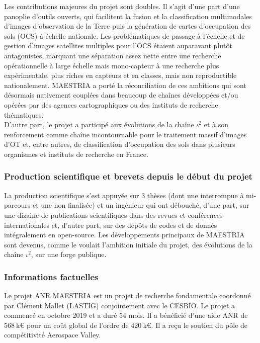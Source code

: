 Les contributions majeures du projet sont doubles. Il s’agit d’une part d’une panoplie d’outils ouverts, qui facilitent la fusion et la classification multimodales d’images d’observation de la Terre puis la génération de cartes d’occupation des sols (OCS) à échelle nationale. Les problématiques de passage à l’échelle et de gestion d’images satellites multiples pour l’OCS étaient auparavant plutôt antagonistes, marquant une séparation assez nette entre une recherche opérationnelle à large échelle mais mono-capteur à une recherche plus expérimentale, plus riches en capteurs et en classes, mais non reproductible nationalement. MAESTRIA a porté la réconciliation de ces ambitions qui sont désormais nativement couplées dans beaucoup de chaînes développées et/ou opérées par des agences cartographiques ou des instituts de recherche thématiques.\\
D’autre part, le projet a participé aux évolutions de la chaîne $\iota^2$ et à son renforcement comme chaîne incontournable pour le traitement massif d’images d’OT et, entre autres, de classification d’occupation des sols dans plusieurs organismes et instituts de recherche en France.


\subsubsection*{Production scientifique et brevets depuis le début du projet}
La production scientifique s’est appuyée sur 3 thèses (dont une interrompue à mi-parcours et une non finalisée) et un ingénieur qui ont débouché, d’une part,  sur une dizaine de publications scientifiques dans des revues et conférences internationales et, d’autre part, sur des dépôts de codes et de donnés intégralement en open-source. Les développements principaux de MAESTRIA sont devenus, comme le voulait l’ambition initiale du projet, des évolutions de la chaîne \href{https://framagit.org/iota2-project/iota2}{$\iota^2$}, sur une forge publique.

\subsubsection*{Informations factuelles}

Le projet ANR MAESTRIA est un projet de recherche fondamentale coordonné par Clément Mallet (LASTIG) conjointement avec le CESBIO. Le projet a commencé en octobre 2019 et a duré 54 mois. Il a bénéficié d’une aide ANR de 568$\:$k€ pour un coût global de l’ordre de 420$\:$k€. Il a reçu le soutien du pôle de compétitivité Aerospace Valley.

